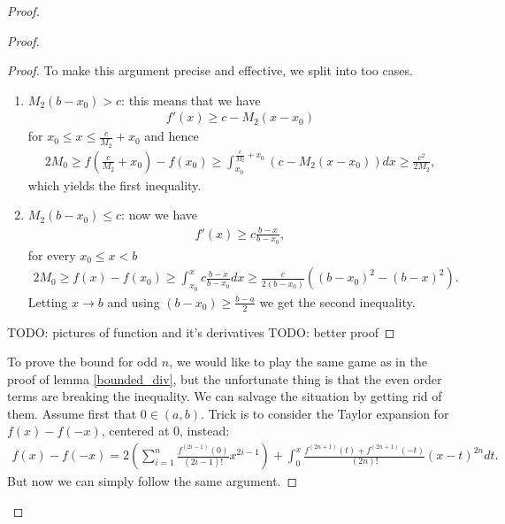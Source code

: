 \begin{proof}
\begin{proof}
\begin{proof}
			To make this argument precise and effective, we split into too cases.

			\begin{enumerate}
				\item $M_{2} (b - x_{0}) > c$: this means that we have
				\begin{align*}
					f'(x) \geq c - M_{2} (x - x_{0})
				\end{align*}
				for $x_{0} \leq x \leq \frac{c}{M_{2}} + x_{0}$ and hence
				\begin{align*}
					2 M_{0} \geq f\left(\frac{c}{M_{2}} + x_{0}\right) - f(x_{0}) \geq \int_{x_{0}}^{\frac{c}{M_{2}} + x_{0}} \left(c - M_{2} (x - x_{0})\right) dx \geq \frac{c^2}{2 M_{2}},
				\end{align*}
				which yields the first inequality.
				\item $M_{2} (b - x_{0}) \leq c$: now we have
				\begin{align*}
					f'(x) \geq c \frac{b - x}{b - x_{0}},
				\end{align*}
				for every $x_{0} \leq x < b$
				\begin{align*}
					2 M_{0} \geq f(x) - f(x_{0}) \geq \int_{x_{0}}^{x}  c \frac{b - x}{b - x_{0}} d x \geq \frac{c}{2(b - x_{0})} \left((b - x_{0})^2 - (b - x)^2\right).
				\end{align*}
				Letting $x \to b$ and using $(b - x_{0}) \geq \frac{b - a}{2}$ we get the second inequality.
			\end{enumerate}

			TODO: pictures of function and it's derivatives
			TODO: better proof
		\end{proof}

		To prove the bound for odd $n$, we would like to play the same game as in the proof of lemma \ref{bounded_div}, but the unfortunate thing is that the even order terms are breaking the inequality. We can salvage the situation by getting rid of them. Assume first that $0 \in (a, b)$. Trick is to consider the Taylor expansion for $f(x) - f(-x)$, centered at $0$, instead:
		\begin{align*}
			f(x) - f(-x) = 2 \left(\sum_{i = 1}^{n} \frac{f^{(2 i - 1)}(0)}{(2 i - 1)!}x^{2 i - 1}\right) + \int_{0}^{x} \frac{f^{(2 n + 1)}(t) + f^{(2 n + 1)}(-t)}{(2n)!} (x - t)^{2 n} dt.
		\end{align*}
		But now we can simply follow the same argument.
	\end{proof}

\end{proof}


